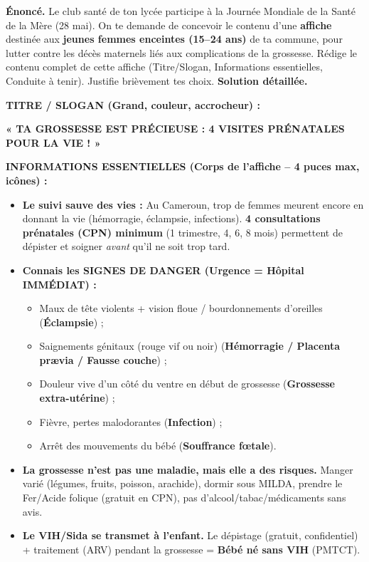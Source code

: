\documentclass[11pt]{article}
\begin{document}
\begin{exoresolu}
\textbf{Énoncé.} Le club santé de ton lycée participe à la Journée Mondiale de la Santé de la Mère (28 mai). On te demande de concevoir le contenu d'une \textbf{affiche} destinée aux \textbf{jeunes femmes enceintes (15--24 ans)} de ta commune, pour lutter contre les décès maternels liés aux complications de la grossesse. Rédige le contenu complet de cette affiche (Titre/Slogan, Informations essentielles, Conduite à tenir). Justifie brièvement tes choix.
\tcblower
\textbf{Solution détaillée.}

\textbf{TITRE / SLOGAN (Grand, couleur, accrocheur) :}
\begin{center}
\textcolor{poporange}{\textbf{« TA GROSSESSE EST PRÉCIEUSE : 4 VISITES PRÉNATALES POUR LA VIE ! »}}
\end{center}

\textbf{INFORMATIONS ESSENTIELLES (Corps de l'affiche -- 4 puces max, icônes) :}
\begin{itemize}
\item \textbf{Le suivi sauve des vies :} Au Cameroun, trop de femmes meurent encore en donnant la vie (hémorragie, éclampsie, infections). \textbf{4 consultations prénatales (CPN) minimum} (1\ier{} trimestre, 4\ieme{}, 6\ieme{}, 8\ieme{} mois) permettent de dépister et soigner \emph{avant} qu'il ne soit trop tard.
\item \textbf{Connais les SIGNES DE DANGER (Urgence = Hôpital IMMÉDIAT) :}
\begin{itemize}
\item Maux de tête violents + vision floue / bourdonnements d'oreilles (\textbf{Éclampsie}) ;
\item Saignements génitaux (rouge vif ou noir) (\textbf{Hémorragie / Placenta prævia / Fausse couche}) ;
\item Douleur vive d'un côté du ventre en début de grossesse (\textbf{Grossesse extra-utérine}) ;
\item Fièvre, pertes malodorantes (\textbf{Infection}) ;
\item Arrêt des mouvements du bébé (\textbf{Souffrance f\oe tale}).
\end{itemize}
\item \textbf{La grossesse n'est pas une maladie, mais elle a des risques.} Manger varié (légumes, fruits, poisson, arachide), dormir sous MILDA, prendre le Fer/Acide folique (gratuit en CPN), pas d'alcool/tabac/médicaments sans avis.
\item \textbf{Le VIH/Sida se transmet à l'enfant.} Le dépistage (gratuit, confidentiel) + traitement (ARV) pendant la grossesse = \textbf{Bébé né sans VIH} (PMTCT).
\end{itemize}


\end{exoresolu}
\end{document}
